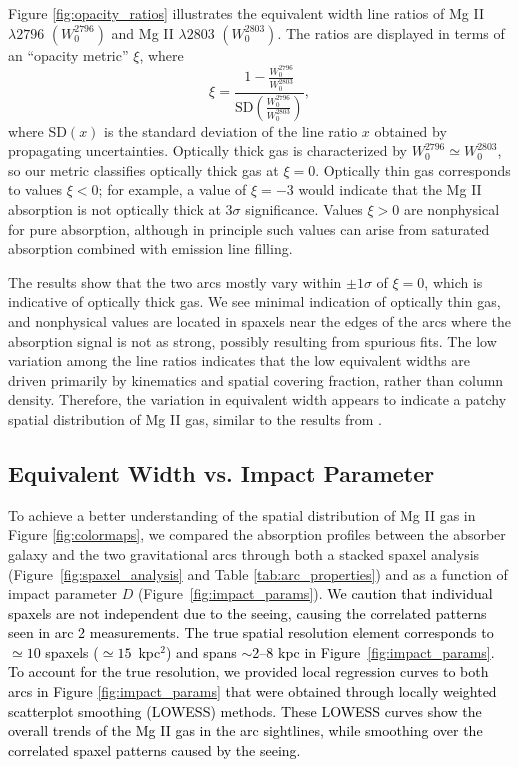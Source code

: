 \documentclass[twocolumn]{aastex62}
\newcommand{\MgII}{Mg\tiny{ }\footnotesize{II}\normalsize{ }}
\begin{document}
Figure \ref{fig:opacity_ratios} illustrates the equivalent width line ratios of \MgII $\lambda2796$ $\left(W_0^{2796}\right)$ and \MgII $\lambda2803$ $\left(W_0^{2803}\right)$. The ratios are displayed in terms of an ``opacity metric'' $\xi$, where
\begin{equation}
    \xi = \frac{1-\frac{W_0^{2796}}{W_0^{2803}}}{\text{SD}\left(\frac{W_0^{2796}}{W_0^{2803}}\right)},
\end{equation}
where SD$(x)$ is the standard deviation of the line ratio $x$ obtained by propagating uncertainties. Optically thick gas is characterized by $W_0^{2796} \simeq W_0^{2803}$, so our metric classifies optically thick gas at $\xi=0$. Optically thin gas corresponds to values $\xi<0$; for example, a value of $\xi=-3$ would indicate that the \MgII absorption is not optically thick at 3$\sigma$ significance. Values $\xi>0$ are nonphysical for pure absorption, although in principle such values can arise from saturated absorption combined with emission line filling. 

The results show that the two arcs mostly vary within $\pm1\sigma$ of $\xi=0$, which is indicative of optically thick gas. We see minimal indication of optically thin gas, and nonphysical values  are located in spaxels near the edges of the arcs where the absorption signal is not as strong, possibly resulting from spurious fits. The low variation among the line ratios indicates that the low equivalent widths are driven primarily by kinematics and spatial covering fraction, rather than column density. Therefore, the variation in equivalent width appears to indicate a patchy spatial distribution of \MgII gas, similar to the results from \cite{Lopez2018,Lopez2020}.

\subsection{Equivalent Width vs. Impact Parameter}\label{sec:ew_b}


To achieve a better understanding of the spatial distribution of \MgII gas in Figure \ref{fig:colormaps}, we compared the absorption profiles between the absorber galaxy and the two gravitational arcs through both a stacked spaxel analysis  (Figure~\ref{fig:spaxel_analysis} and Table \ref{tab:arc_properties}) and as a function of impact parameter $D$ (Figure~\ref{fig:impact_params}). \textcolor{black}{We caution that individual spaxels are not independent due to the seeing, causing the correlated patterns seen in arc 2 measurements. The true spatial resolution element corresponds to $\simeq10$ spaxels ($\simeq15$~kpc$^2$) and spans $\sim$2--8 kpc in Figure~\ref{fig:impact_params}. To account for the true resolution, we provided local regression curves to both arcs in Figure \ref{fig:impact_params} that were obtained through locally weighted scatterplot smoothing (LOWESS) methods. These LOWESS curves show the overall trends of the \MgII gas in the arc sightlines, while smoothing over the correlated spaxel patterns caused by the seeing.}
\end{document}
